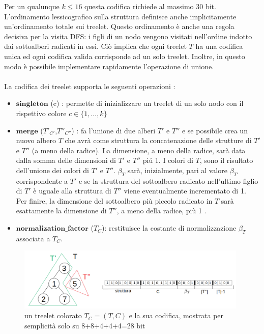 Per un qualunque $ k \le 16 $ questa codifica richiede al massimo 30 bit.
L'ordinamento lessicografico sulla struttura definisce anche implicitamente un'ordinamento totale sui treelet. Questo ordinamento \`e anche una regola decisiva per la visita DFS: i figli di un nodo vengono visitati nell'ordine indotto dai sottoalberi radicati in essi.
Ci\`o implica che ogni treelet $ T $ ha una codifica unica ed ogni codifica valida corrisponde ad un solo treelet. Inoltre, in questo modo \`e possibile implementare rapidamente l'operazione di unione.\\\\
La codifica dei treelet supporta le seguenti operazioni :
\begin{itemize}
	\item $ \textbf{singleton} $ (c) : permette di inizializzare un treelet di un solo nodo con il rispettivo colore $ c \in \{1, \dots, k\} $
	\item $ \textbf{merge} $ ($ T'_{C'} $,$ T''_{C''} $) : fa l'unione di due alberi $ T' $ e $ T'' $ e se possibile crea un nuovo albero $ T $ che avr\`a come struttura la concatenazione delle strutture di $ T' $ e $ T'' $ (a meno della radice).
	La dimensione, a meno della radice, sar\`a data dalla somma delle dimensioni di $ T' $ e $ T'' $ pi\'u 1.
	I colori di $ T $, sono il risultato dell'unione dei colori di $ T' $ e $ T'' $.
	$ \beta_T $ sar\`a, inizialmente, pari al valore $ \beta_{T'} $ corrispondente a $ T' $ e se la struttura del sottoalbero radicato nell'ultimo figlio di $ T' $ \`e uguale alla struttura di $ T'' $ viene eventualmente incrementato di 1.\\
 	 Per finire, la dimensione del sottoalbero pi\`u piccolo radicato in $ T $ sar\`a esattamente la dimensione di $ T'' $, a meno della radice, pi\`u 1 .
	\item $\textbf{normalization\_factor}$ ($ T_C $): restituisce la costante di normalizzazione $ \beta_T $ associata a $ T_C $.
	    
\end{itemize}
\begin{figure}[htbp]
	\centering
	\includegraphics[width=11cm]{capitolo2/grafo5}
	\caption{un treelet colorato $ T_C =(T,C) $ e la sua codifica, mostrata per semplicit\`a solo su 8+8+4+4+4=28 bit}
	\label{figura1}
\end{figure}
